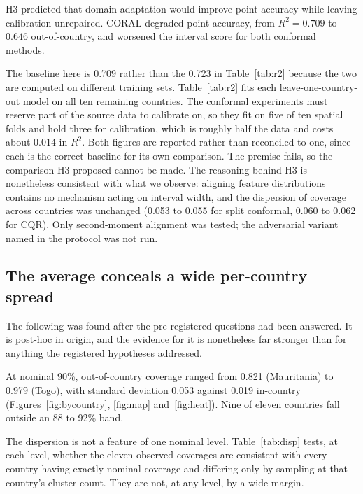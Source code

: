 \documentclass[11pt]{article}
\begin{document}
H3 predicted that domain adaptation would improve point accuracy while leaving
calibration unrepaired. CORAL \citep{sun2016} degraded point accuracy, from
$R^2 = 0.709$ to $0.646$ out-of-country, and worsened the interval score for
both conformal methods.

The baseline here is 0.709 rather than the 0.723 in Table~\ref{tab:r2} because
the two are computed on different training sets. Table~\ref{tab:r2} fits each
leave-one-country-out model on all ten remaining countries. The conformal
experiments must reserve part of the source data to calibrate on, so they fit
on five of ten spatial folds and hold three for calibration, which is roughly
half the data and costs about 0.014 in $R^2$. Both figures are reported rather
than reconciled to one, since each is the correct baseline for its own
comparison. The premise fails, so the comparison H3 proposed cannot be made. The
reasoning behind H3 is nonetheless consistent with what we observe: aligning
feature distributions contains no mechanism acting on interval width, and the
dispersion of coverage across countries was unchanged (0.053 to 0.055 for split
conformal, 0.060 to 0.062 for CQR). Only second-moment alignment was tested; the
adversarial variant named in the protocol was not run.

\subsection{The average conceals a wide per-country spread}
\label{sec:disp}

The following was found after the pre-registered questions had been answered.
It is post-hoc in origin, and the evidence for it is nonetheless far stronger
than for anything the registered hypotheses addressed.


At nominal 90\%, out-of-country coverage ranged from 0.821 (Mauritania) to
0.979 (Togo), with standard deviation 0.053 against 0.019 in-country
(Figures~\ref{fig:bycountry}, \ref{fig:map} and~\ref{fig:heat}). Nine of
eleven countries fall
outside an 88 to 92\% band.

The dispersion is not a feature of one nominal level. Table~\ref{tab:disp}
tests, at each level, whether the eleven observed coverages are consistent with
every country having exactly nominal coverage and differing only by sampling at
that country's cluster count. They are not, at any level, by a wide margin.
\end{document}
